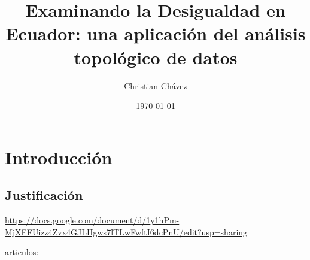 \documentclass[a4paper,11pt]{article}
\title{
    Examinando la Desigualdad en Ecuador: una aplicación del análisis topológico de datos
}
\author{Christian Chávez}
\date{\today}
\newcommand{\red}[1]{\textcolor{red}{#1}}
\begin{document}
\maketitle

\begin{abstract}
    
\end{abstract}

\section{Introducción}


\subsection{Justificación}





\url{https://docs.google.com/document/d/1y1hPm-MjXFFUizz4Zvx4GJLHgws7lTLwFwftI6dcPnU/edit?usp=sharing}

articulos:
\end{document}
